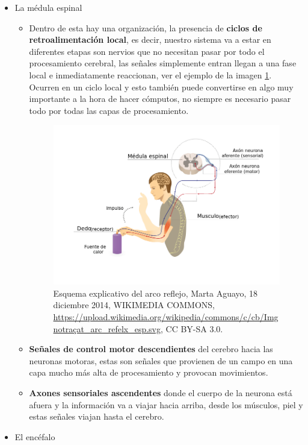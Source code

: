 \begin{itemize}
 \item La médula espinal
    \begin{itemize}
     \item Dentro de esta hay una organización, la presencia de \textbf{ciclos de retroalimentación local}, es decir, nuestro sistema va a estar en diferentes etapas son nervios que no necesitan pasar por todo el procesamiento cerebral, las señales simplemente entran llegan a una fase local e inmediatamente reaccionan, ver el ejemplo de la imagen \ref{actReflejo}. Ocurren en un ciclo local y esto también puede convertirse en algo muy importante a la hora de hacer cómputos, no siempre es necesario pasar todo por todas las capas de procesamiento. 


     \begin{figure}[h]
      \centering
      \includegraphics[scale=0.4]{../Figuras/actReflejo.png}
      \caption{ Esquema explicativo del arco reflejo, Marta Aguayo, 18 diciembre 2014, WIKIMEDIA COMMONS, \url{https://upload.wikimedia.org/wikipedia/commons/c/cb/Imgnotraçat_arc_refelx_esp.svg}, CC BY-SA 3.0.}
      \label{actReflejo}
     \end{figure}


     \item \textbf{Señales de control motor descendientes} del cerebro hacia las neuronas motoras, estas son señales que provienen de un campo en una capa mucho más alta de procesamiento y provocan movimientos.
     
     \item \textbf{Axones sensoriales ascendentes} donde el cuerpo de la neurona está afuera y la información va a viajar hacia arriba, desde los músculos, piel y  estas señales viajan hasta el cerebro.  


     \end{itemize}


 \item El encéfalo
\end{itemize}


